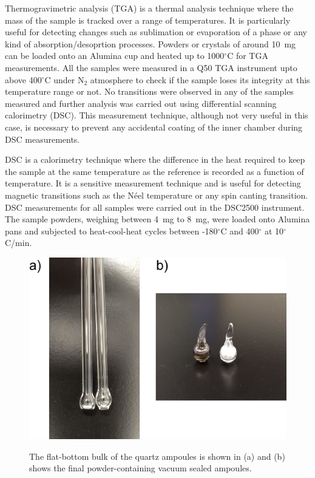 \documentclass[10pt,doublespacing,edeposit]{uiucthesis2020}
\begin{document}
\begin{mainmatter}
Thermogravimetric analysis (TGA) is a thermal analysis technique where the mass of the sample is tracked over a range of temperatures. It is particularly useful for detecting changes such as sublimation or evaporation of a phase or any kind of absorption/desoprtion processes. Powders or crystals of around 10~mg can be loaded onto an Alumina cup and heated up to 1000$^\circ$C for TGA measurements. All the samples were measured in a Q50 TGA instrument upto above 400$^\circ$C under N$_2$ atmosphere to check if the sample loses its integrity at this temperature range or not. No transitions were observed in any of the samples measured and further analysis was carried out using differential scanning calorimetry (DSC). This measurement technique, although not very useful in this case, is necessary to prevent any accidental coating of the inner chamber during DSC measurements.

DSC is a calorimetry technique where the difference in the heat required to keep the sample at the same temperature as the reference is recorded as a function of temperature. It is a sensitive measurement technique and is useful for detecting magnetic transitions such as the N\'eel temperature or any spin canting transition. DSC measurements for all samples were carried out in the DSC2500 instrument. The sample powders, weighing between 4~mg to 8~mg, were loaded onto Alumina pans and subjected to heat-cool-heat cycles between -180$^\circ$C and 400$^\circ$ at 10$^\circ$C/min.

\begin{figure}
\centering\includegraphics[width=0.6\columnwidth]{figures/ch3/DTA_tubes_combined.jpg} \\
\caption{\label{fig:DTA_tubes_combined}
The flat-bottom bulk of the quartz ampoules is shown in (a) and (b) shows the final powder-containing vacuum sealed ampoules.
}
\end{figure}


\end{mainmatter}
\end{document}
